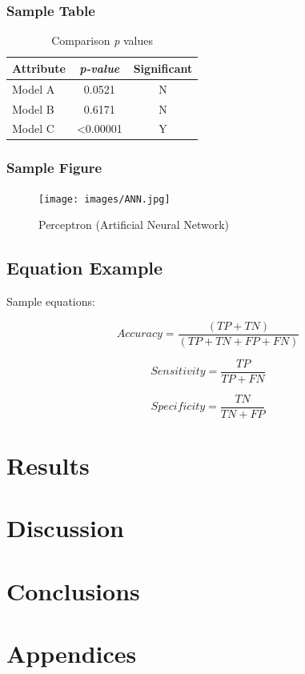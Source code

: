 \documentclass[12pt]{article}
\begin{document}
\subsubsection{Sample Table}
\begin{table}[ht!]
\centering
    
	\caption{Comparison \textit{p} values}
	\begin{tabular}{ |l|c|c|}	
		\hline		
		\textbf{Attribute} & \textbf{\textit{p-value}} & \textbf{Significant} \\ \hline
		Model A	 & 0.0521 & N \\ \hline
		Model B  & 0.6171 & N \\ \hline 
		Model C  & <0.00001 & Y \\ \hline 
	\end{tabular}
	\label{tab:pvalues}
\end{table} 


\subsubsection{Sample Figure}
\begin{figure}[ht!]
 	\centering
 	\caption{Perceptron (Artificial Neural Network)}
 	\texttt{[image: images/ANN.jpg]}
 	\label{lab:perceptron}
 \end{figure}
 

\subsection{Equation Example}
Sample equations:

\begin{equation}
Accuracy = \frac{(TP + TN)}{(TP + TN + FP + FN)}
\end{equation}


\begin{equation}
Sensitivity = \frac{TP}{TP + FN}
\end{equation}

\begin{equation}
Specificity = \frac{TN}{TN + FP}
\end{equation}

\pagebreak



\section{Results}


\pagebreak





\section{Discussion}
\pagebreak


\section{Conclusions}
\pagebreak


\section{Appendices}
\pagebreak


\printbibliography
\end{document}
